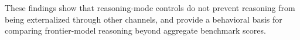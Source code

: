 \documentclass[10pt,letterpaper]{article}
\newcommand{\jane}[1]{}
\begin{document}
These findings show that reasoning-mode controls do not prevent
reasoning from being externalized through other channels, and provide a behavioral
basis for comparing frontier-model reasoning beyond aggregate benchmark scores.





\end{document}
